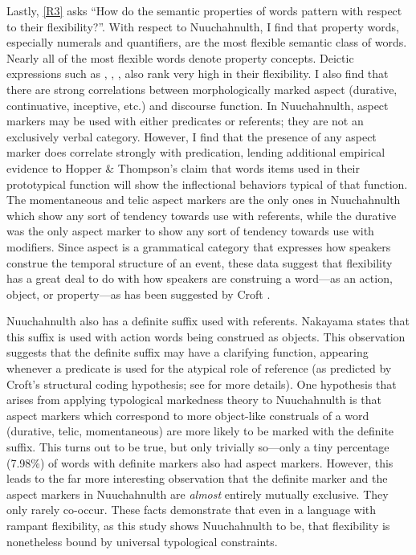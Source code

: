 Lastly, \ref{R3} asks \enquote{How do the semantic properties of words pattern with respect to their flexibility?}. With respect to Nuuchahnulth, I find that property words, especially numerals and quantifiers, are the most flexible semantic class of words. Nearly all of the most flexible words denote property concepts. Deictic expressions such as , , ,  also rank very high in their flexibility. I also find that there are strong correlations between morphologically marked aspect (durative, continuative, inceptive, etc.) and discourse function. In Nuuchahnulth, aspect markers may be used with either predicates or referents; they are not an exclusively verbal category. However, I find that the presence of any aspect marker does correlate strongly with predication, lending additional empirical evidence to Hopper \& Thompson's  claim that words items used in their prototypical function will show the inflectional behaviors typical of that function. The momentaneous and telic aspect markers are the only ones in Nuuchahnulth which show any sort of tendency towards use with referents, while the durative was the only aspect marker to show any sort of tendency towards use with modifiers. Since aspect is a grammatical category that expresses how speakers construe the temporal structure of an event, these data suggest that flexibility has a great deal to do with how speakers are construing a word—as an action, object, or property—as has been suggested by Croft .

Nuuchahnulth also has a definite suffix  used with referents. Nakayama  states that this suffix is used with action words being construed as objects. This observation suggests that the definite suffix may have a clarifying function, appearing whenever a predicate is used for the atypical role of reference (as predicted by Croft's structural coding hypothesis; see  for more details). One hypothesis that arises from applying typological markedness theory to Nuuchahnulth is that aspect markers which correspond to more object-like construals of a word (durative, telic, momentaneous) are more likely to be marked with the definite suffix. This turns out to be true, but only trivially so—only a tiny percentage (7.98\%) of words with definite markers also had aspect markers. However, this leads to the far more interesting observation that the definite marker and the aspect markers in Nuuchahnulth are \emph{almost} entirely mutually exclusive. They only rarely co-occur. These facts demonstrate that even in a language with rampant flexibility, as this study shows Nuuchahnulth to be, that flexibility is nonetheless bound by universal typological constraints.

